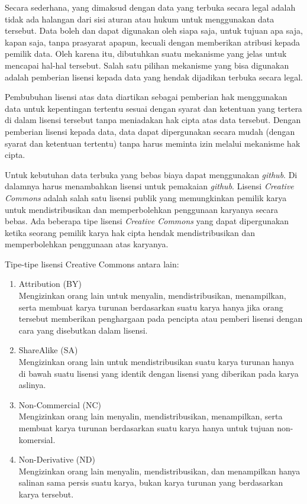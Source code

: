 Secara sederhana, yang dimaksud dengan data yang terbuka secara legal adalah tidak ada halangan dari sisi aturan atau hukum untuk menggunakan data tersebut. Data boleh dan dapat digunakan oleh siapa saja, untuk tujuan apa saja, kapan saja, tanpa prasyarat apapun, kecuali dengan memberikan atribusi kepada pemilik data. Oleh karena itu, dibutuhkan suatu mekanisme yang jelas untuk mencapai hal-hal tersebut. Salah satu pilihan mekanisme yang bisa digunakan adalah pemberian lisensi kepada data yang hendak dijadikan terbuka secara legal.   

Pembubuhan lisensi atas data diartikan sebagai pemberian hak menggunakan data untuk kepentingan tertentu sesuai dengan syarat dan ketentuan yang tertera di dalam lisensi tersebut tanpa meniadakan hak cipta atas data tersebut. Dengan pemberian lisensi kepada data, data dapat dipergunakan secara mudah (dengan syarat dan ketentuan tertentu) tanpa harus meminta izin melalui mekanisme hak cipta. 

Untuk kebutuhan data terbuka yang bebas biaya dapat menggunakan \textit{github}. Di dalamnya harus menambahkan lisensi untuk pemakaian \textit{github}. Lisensi \textit{Creative Commons} adalah salah satu lisensi publik yang memungkinkan pemilik karya untuk mendistribusikan dan memperbolehkan penggunaan karyanya secara bebas. Ada beberapa tipe lisensi \textit{Creative Commons} yang dapat dipergunakan ketika seorang pemilik karya hak cipta hendak mendistribusikan dan memperbolehkan penggunaan atas karyanya.  

Tipe-tipe lisensi Creative Commons antara lain:
\begin{enumerate}
\item Attribution (BY) \\
Mengizinkan orang lain untuk menyalin, mendistribusikan, menampilkan, serta membuat karya turunan berdasarkan suatu karya hanya jika orang tersebut memberikan penghargaan pada pencipta atau pemberi lisensi dengan cara yang disebutkan dalam lisensi.
\item ShareAlike (SA) \\
Mengizinkan orang lain untuk mendistribusikan suatu karya turunan hanya di bawah suatu lisensi yang identik dengan lisensi yang diberikan pada karya aslinya. 
\item Non-Commercial (NC) \\
Mengizinkan orang lain menyalin, mendistribusikan, menampilkan, serta membuat karya turunan berdasarkan suatu karya hanya untuk tujuan non-komersial.
\item Non-Derivative (ND) \\ 
Mengizinkan orang lain menyalin, mendistribusikan, dan menampilkan hanya salinan sama persis suatu karya, bukan karya turunan yang berdasarkan karya tersebut.   
\end{enumerate}

